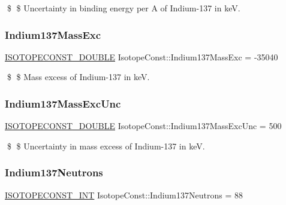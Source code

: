 \$ \$ Uncertainty in binding energy per A of Indium-\/137 in keV. \mbox{\label{group___isotope_const-_indium-_in137_ga9a80fb6f1a775c7f72bc2e94257501fd}} 
\subsubsection{\texorpdfstring{Indium137\+Mass\+Exc}{Indium137MassExc}}
{\footnotesize\ttfamily \mbox{\hyperlink{group___isotope_const-_macros_ga8f45a7272ce02c0b4c65c44636ed719a}{I\+S\+O\+T\+O\+P\+E\+C\+O\+N\+S\+T\+\_\+\+D\+O\+U\+B\+LE}} Isotope\+Const\+::\+Indium137\+Mass\+Exc = -\/35040}

\$ \$ Mass excess of Indium-\/137 in keV. \mbox{\label{group___isotope_const-_indium-_in137_ga2f4726f5589fd786a25166d5f3ba9dba}} 
\subsubsection{\texorpdfstring{Indium137\+Mass\+Exc\+Unc}{Indium137MassExcUnc}}
{\footnotesize\ttfamily \mbox{\hyperlink{group___isotope_const-_macros_ga8f45a7272ce02c0b4c65c44636ed719a}{I\+S\+O\+T\+O\+P\+E\+C\+O\+N\+S\+T\+\_\+\+D\+O\+U\+B\+LE}} Isotope\+Const\+::\+Indium137\+Mass\+Exc\+Unc = 500}

\$ \$ Uncertainty in mass excess of Indium-\/137 in keV. \mbox{\label{group___isotope_const-_indium-_in137_gad8be0693eb33687c20cedaec53837dae}} 
\subsubsection{\texorpdfstring{Indium137\+Neutrons}{Indium137Neutrons}}
{\footnotesize\ttfamily \mbox{\hyperlink{group___isotope_const-_macros_ga5f18360b3e99483a35c32d789e62621c}{I\+S\+O\+T\+O\+P\+E\+C\+O\+N\+S\+T\+\_\+\+I\+NT}} Isotope\+Const\+::\+Indium137\+Neutrons = 88}

